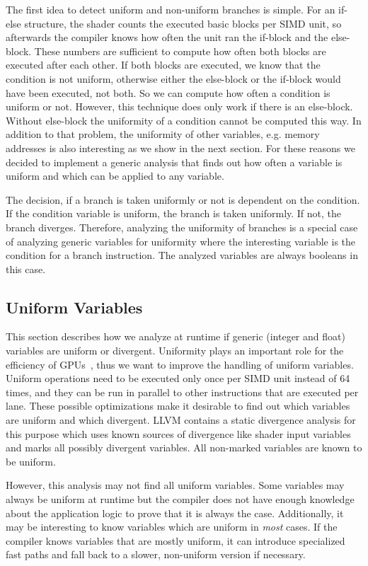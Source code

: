 The first idea to detect uniform and non-uniform branches is simple.
For an if-else structure, the shader counts the executed basic blocks per SIMD unit, so afterwards the compiler knows how often the unit ran the if-block and the else-block. These numbers are sufficient to compute how often both blocks are executed after each other.
If both blocks are executed, we know that the condition is not uniform, otherwise either the else-block or the if-block would have been executed, not both. So we can compute how often a condition is uniform or not.
However, this technique does only work if there is an else-block. Without else-block the uniformity of a condition cannot be computed this way.
In addition to that problem, the uniformity of other variables, e.g. memory addresses is also interesting as we show in the next section.
For these reasons we decided to implement a generic analysis that finds out how often a variable is uniform and which can be applied to any variable.

The decision, if a branch is taken uniformly or not is dependent on the condition.
If the condition variable is uniform, the branch is taken uniformly. If not, the branch diverges.
Therefore, analyzing the uniformity of branches is a special case of analyzing generic variables for uniformity where the interesting variable is the condition for a branch instruction.
The analyzed variables are always booleans in this case.

\subsection{Uniform Variables}
\label{sub:uniformity}
This section describes how we analyze at runtime if generic (integer and float) variables are uniform or divergent.
Uniformity plays an important role for the efficiency of GPUs~\cite{Chen2016}, thus we want to improve the handling of uniform variables.
Uniform operations need to be executed only once per SIMD unit instead of 64 times, and they can be run in parallel to other instructions that are executed per lane.
These possible optimizations make it desirable to find out which variables are uniform and which divergent.
LLVM contains a static divergence analysis for this purpose which uses known sources of divergence like shader input variables and marks all possibly divergent variables.
All non-marked variables are known to be uniform.

However, this analysis may not find all uniform variables.
Some variables may always be uniform at runtime but the compiler does not have enough knowledge about the application logic to prove that it is always the case.
Additionally, it may be interesting to know variables which are uniform in \emph{most} cases.
If the compiler knows variables that are mostly uniform, it can introduce specialized fast paths and fall back to a slower, non-uniform version if necessary.

